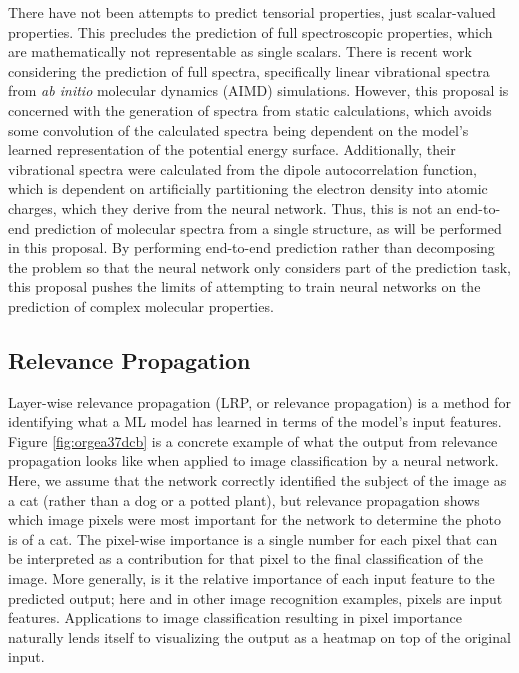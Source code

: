 \documentclass[12pt]{article}
\begin{document}
There have not been attempts to predict tensorial properties, just scalar-valued properties. This precludes the prediction of full spectroscopic properties, which are mathematically not representable as single scalars. There is recent work considering the prediction of full spectra, specifically linear vibrational spectra from \emph{ab initio} molecular dynamics (AIMD) simulations\cite{2017arXiv170505907G}. However, this proposal is concerned with the generation of spectra from static calculations, which avoids some convolution of the calculated spectra being dependent on the model's learned representation of the potential energy surface. Additionally, their vibrational spectra were calculated from the dipole autocorrelation function, which is dependent on artificially partitioning the electron density into atomic charges, which they derive from the neural network. Thus, this is not an end-to-end \cite{2016arXiv160407316B} prediction of molecular spectra from a single structure, as will be performed in this proposal. By performing end-to-end prediction rather than decomposing the problem so that the neural network only considers part of the prediction task, this proposal pushes the limits of attempting to train neural networks on the prediction of complex molecular properties.

\subsection{Relevance Propagation}
\label{sec:org41e33f6}

Layer-wise relevance propagation (LRP, or relevance propagation) is a method for identifying what a ML model has learned \cite{10.1371/journal.pone.0130140} in terms of the model's input features. Figure \ref{fig:orgea37dcb} is a concrete example of what the output from relevance propagation looks like when applied to image classification by a neural network. Here, we assume that the network correctly identified the subject of the image as a cat (rather than a dog or a potted plant), but relevance propagation shows which image pixels were most important for the network to determine the photo is of a cat. The pixel-wise importance is a single number for each pixel that can be interpreted as a contribution for that pixel to the final classification of the image. More generally, is it the relative importance of each input feature to the predicted output; here and in other image recognition examples, pixels are input features. Applications to image classification resulting in pixel importance naturally lends itself to visualizing the output as a heatmap on top of the original input.
\end{document}
